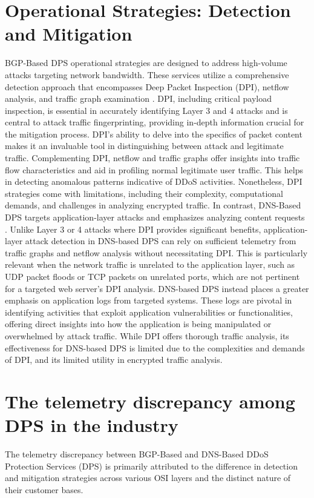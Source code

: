 \section{Operational Strategies: Detection and Mitigation}\label{sec:operations}
BGP-Based DPS operational strategies are designed to address high-volume attacks targeting network bandwidth. These services utilize a comprehensive detection approach that encompasses Deep Packet Inspection (DPI), netflow analysis, and traffic graph examination \cite{wang2018delving} \cite{saied2016detection}. DPI, including critical payload inspection, is essential in accurately identifying Layer 3 and 4 attacks and is central to attack traffic fingerprinting, providing in-depth information crucial for the mitigation process. DPI's ability to delve into the specifics of packet content makes it an invaluable tool in distinguishing between attack and legitimate traffic. Complementing DPI, netflow and traffic graphs offer insights into traffic flow characteristics and aid in profiling normal legitimate user traffic. This helps in detecting anomalous patterns indicative of DDoS activities. Nonetheless, DPI strategies come with limitations, including their complexity, computational demands, and challenges in analyzing encrypted traffic. In contrast, DNS-Based DPS targets application-layer attacks and emphasizes analyzing content requests \cite{xie2008monitoring}. Unlike Layer 3 or 4 attacks where DPI provides significant benefits, application-layer attack detection in DNS-based DPS can rely on sufficient telemetry from traffic graphs and netflow analysis without necessitating DPI. This is particularly relevant when the network traffic is unrelated to the application layer, such as UDP packet floods or TCP packets on unrelated ports, which are not pertinent for a targeted web server's DPI analysis. DNS-based DPS instead places a greater emphasis on application logs from targeted systems. These logs are pivotal in identifying activities that exploit application vulnerabilities or functionalities, offering direct insights into how the application is being manipulated or overwhelmed by attack traffic. While DPI offers thorough traffic analysis, its effectiveness for DNS-based DPS is limited due to the complexities and demands of DPI, and its limited utility in encrypted traffic analysis.

\section{The telemetry discrepancy among DPS in the industry}\label{sec:telemetry}
The telemetry discrepancy between BGP-Based and DNS-Based DDoS Protection Services (DPS) is primarily attributed to the difference in detection and mitigation strategies across various OSI layers and the distinct nature of their customer bases. 
